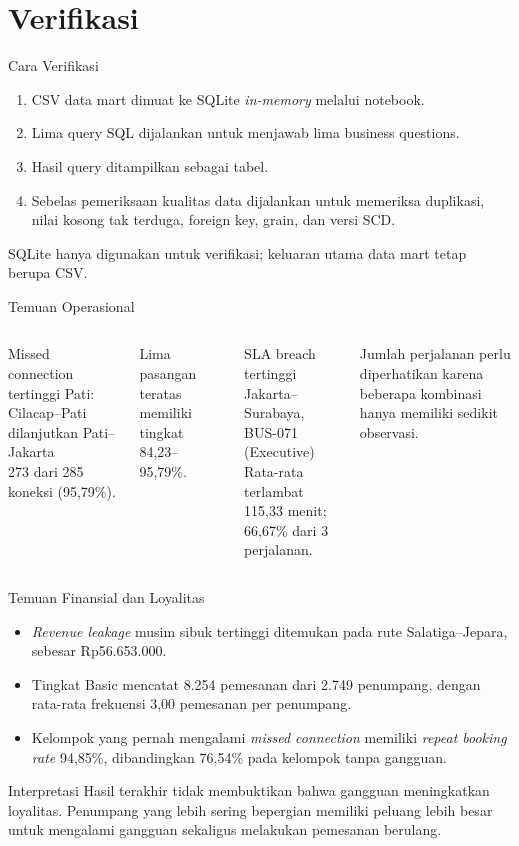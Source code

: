 \documentclass[xcolor=table,t,aspectratio=169]{beamer}
\begin{document}
\section{Verifikasi}

\begin{frame}{Cara Verifikasi}
\footnotesize
\begin{enumerate}
    \item CSV data mart dimuat ke SQLite \textit{in-memory} melalui notebook.
    \item Lima query SQL dijalankan untuk menjawab lima business questions.
    \item Hasil query ditampilkan sebagai tabel.
    \item Sebelas pemeriksaan kualitas data dijalankan untuk memeriksa duplikasi,
    nilai kosong tak terduga, foreign key, grain, dan versi SCD.
\end{enumerate}

SQLite hanya digunakan untuk verifikasi; keluaran utama data mart tetap berupa CSV.
\end{frame}

\begin{frame}{Temuan Operasional}
\footnotesize
\begin{columns}[T]
\begin{block}{Missed connection tertinggi}
Pati: Cilacap--Pati dilanjutkan Pati--Jakarta\\
273 dari 285 koneksi (95,79\%).
\end{block}
Lima pasangan teratas memiliki tingkat 84,23--95,79\%.
\begin{block}{SLA breach tertinggi}
Jakarta--Surabaya, BUS-071 (Executive)\\
Rata-rata terlambat 115,33 menit; 66,67\% dari 3 perjalanan.
\end{block}
Jumlah perjalanan perlu diperhatikan karena beberapa kombinasi hanya memiliki
sedikit observasi.
\end{columns}
\end{frame}

\begin{frame}{Temuan Finansial dan Loyalitas}
\footnotesize
\begin{itemize}
    \item \textit{Revenue leakage} musim sibuk tertinggi ditemukan pada rute
    Salatiga--Jepara, sebesar Rp56.653.000.
    \item Tingkat Basic mencatat 8.254 pemesanan dari 2.749 penumpang, dengan
    rata-rata frekuensi 3,00 pemesanan per penumpang.
    \item Kelompok yang pernah mengalami \textit{missed connection} memiliki
    \textit{repeat booking rate} 94,85\%, dibandingkan 76,54\% pada kelompok tanpa
    gangguan.
\end{itemize}

\begin{alertblock}{Interpretasi}
Hasil terakhir tidak membuktikan bahwa gangguan meningkatkan loyalitas. Penumpang
yang lebih sering bepergian memiliki peluang lebih besar untuk mengalami gangguan
sekaligus melakukan pemesanan berulang.
\end{alertblock}
\end{frame}
\end{document}
